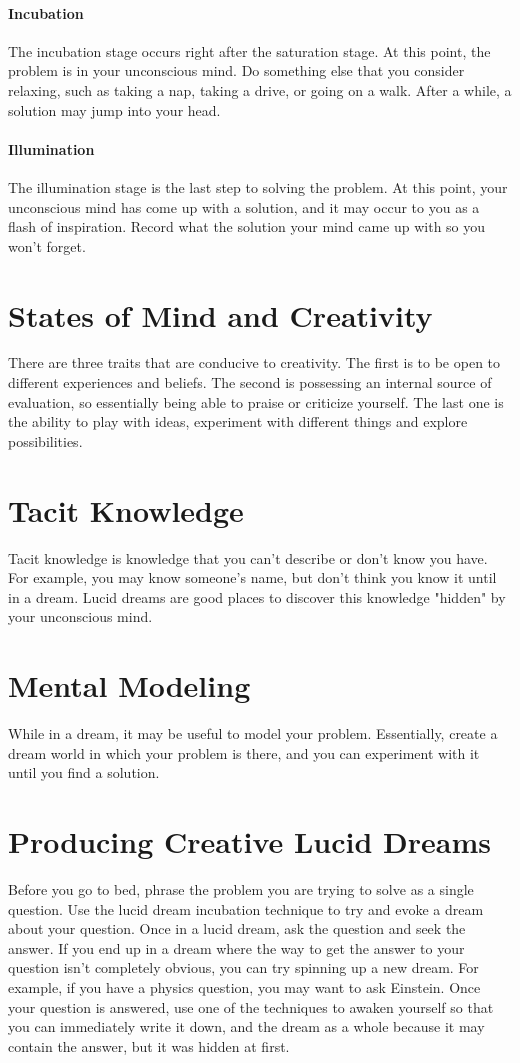 \documentclass{report}
\begin{document}
\paragraph{Incubation} The incubation stage occurs right after the saturation stage. At this point, the problem is in your unconscious mind. Do something else that you consider relaxing, such as taking a nap, taking a drive, or going on a walk. After a while, a solution may jump into your head. 

\paragraph{Illumination} The illumination stage is the last step to solving the problem. At this point, your unconscious mind has come up with a solution, and it may occur to you as a flash of inspiration. Record what the solution your mind came up with so you won't forget. 

\section{States of Mind and Creativity}
There are three traits that are conducive to creativity. The first is to be open to different experiences and beliefs. The second is possessing an internal source of evaluation, so essentially being able to praise or criticize yourself. The last one is the ability to play with ideas, experiment with different things and explore possibilities.

\section{Tacit Knowledge}
Tacit knowledge is knowledge that you can't describe or don't know you have. For example, you may know someone's name, but don't think you know it until in a dream. Lucid dreams are good places to discover this knowledge "hidden" by your unconscious mind. 

\section{Mental Modeling}
While in a dream, it may be useful to model your problem. Essentially, create a dream world in which your problem is there, and you can experiment with it until you find a solution.

\section{Producing Creative Lucid Dreams}
Before you go to bed, phrase the problem you are trying to solve as a single question. Use the lucid dream incubation technique to try and evoke a dream about your question. Once in a lucid dream, ask the question and seek the answer. If you end up in a dream where the way to get the answer to your question isn't completely obvious, you can try spinning up a new dream. For example, if you have a physics question, you may want to ask Einstein. Once your question is answered, use one of the techniques to awaken yourself so that you can immediately write it down, and the dream as a whole because it may contain the answer, but it was hidden at first. 
\end{document}
